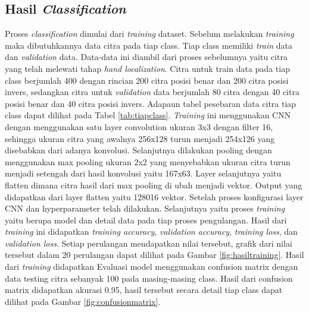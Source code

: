 \documentclass[conference]{IEEEtran}
\begin{document}
\subsection{Hasil \emph{Classification}}
Proses \emph{classification} dimulai dari \emph{training} dataset. Sebelum melakukan \emph{training} maka dibutuhkannya data citra pada tiap class. Tiap class memiliki \emph{train} data dan \emph{validation} data. Data-data ini diambil dari proses sebelumnya yaitu citra yang telah melewati tahap \emph{hand localization}. Citra untuk train data pada tiap class berjumlah 400 dengan rincian 200 citra posisi benar dan 200 citra posisi invers, sedangkan citra untuk \emph{validation} data berjumlah 80 citra dengan 40 citra posisi benar dan 40 citra posisi invers. Adapaun tabel pesebaran data citra tiap class dapat dilihat pada Tabel \ref{tab:tiapclass}. \emph{Training} ini menggunakan CNN dengan menggunakan satu layer convolution ukuran 3x3 dengan filter 16, sehingga ukuran citra yang awalnya 256x128 turun menjadi 254x126 yang disebabkan dari adanya konvolusi. Selanjutnya dilakukan pooling dengan menggunakan max pooling ukuran 2x2 yang menyebabkan ukuran citra turun menjadi setengah dari hasil konvolusi yaitu 167x63. Layer selanjutnya yaitu flatten dimana citra hasil dari max pooling di ubah menjadi vektor. Output yang didapatkan dari layer flatten yaitu 128016 vektor. Setelah proses konfigurasi layer CNN dan hyperparameter telah dilakukan. Selanjutnya yaitu proses \emph{training} yaitu berupa model dan detail data pada tiap proses pengulangan. Hasil dari \emph{training} ini didapatkan \emph{training accuracy}, \emph{validation accuracy}, \emph{training loss}, dan \emph{validation loss}. Setiap perulangan mendapatkan nilai tersebut, grafik dari nilai tersebut dalam 20 perulangan dapat dilihat pada Gambar \ref{fig:hasiltraining}. Hasil dari \emph{training} didapatkan 
 Evaluasi model menggunakan confusion matrix dengan data testing citra sebanyak 100 pada masing-masing class. Hasil dari confusion matrix didapatkan akurasi 0.95, hasil tersebut secara detail tiap class dapat dilihat pada Gambar \ref{fig:confusionmatrix}.
\end{document}

